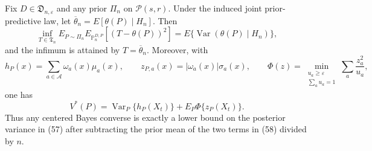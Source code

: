 Fix \(D\in\mathfrak D_{n,\varepsilon}\) and any prior \(\Pi_n\) on \(\mathcal P(s,r)\). Under the induced joint prior-predictive law, let \(\overline\theta_n=E[\theta(P)\mid H_n]\). Then
\[
\inf_{T\in\mathfrak T_n}
E_{P\sim\Pi_n}E_{\mathbb P_n^{D,P}}[(T-\theta(P))^2]
=E\{\operatorname{Var}(\theta(P)\mid H_n)\},
\tag{57}
\]
and the infimum is attained by \(T=\overline\theta_n\). Moreover, with
\[
h_P(x)=\sum_{a\in\mathcal A}\omega_a(x)\mu_a(x),
\qquad
z_{P,a}(x)=|\omega_a(x)|\sigma_a(x),
\qquad
\Phi(z)=\min_{\substack{u_a\geq\varepsilon\\\sum_a u_a=1}}
\sum_a\frac{z_a^2}{u_a},
\]
one has
\[
V^*(P)=\operatorname{Var}_P\{h_P(X_t)\}+E_P\Phi\{z_P(X_t)\}.
\tag{58}
\]
Thus any centered Bayes converse is exactly a lower bound on the posterior variance in (57) after subtracting the prior mean of the two terms in (58) divided by \(n\).